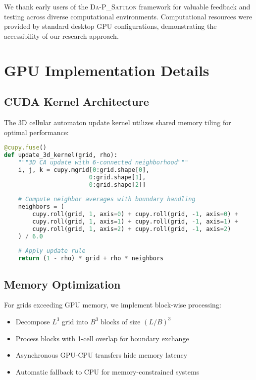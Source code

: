 \documentclass[twocolumn,showpacs,preprintnumbers,amsmath,amssymb,prb]{revtex4-2}
\newcommand{\satulon}{\textsc{Da-P\_Satulon}}
\begin{document}
We thank early users of the \satulon{} framework for valuable feedback and testing across diverse computational environments. Computational resources were provided by standard desktop GPU configurations, demonstrating the accessibility of our research approach.




\appendix

\section{GPU Implementation Details}
\label{app:gpu}

\subsection{CUDA Kernel Architecture}

The 3D cellular automaton update kernel utilizes shared memory tiling for optimal performance:

\begin{lstlisting}[language=Python, caption=GPU-accelerated 3D CA update kernel]
@cupy.fuse()
def update_3d_kernel(grid, rho):
    """3D CA update with 6-connected neighborhood"""
    i, j, k = cupy.mgrid[0:grid.shape[0], 
                        0:grid.shape[1], 
                        0:grid.shape[2]]
    
    # Compute neighbor averages with boundary handling
    neighbors = (
        cupy.roll(grid, 1, axis=0) + cupy.roll(grid, -1, axis=0) +
        cupy.roll(grid, 1, axis=1) + cupy.roll(grid, -1, axis=1) +
        cupy.roll(grid, 1, axis=2) + cupy.roll(grid, -1, axis=2)
    ) / 6.0
    
    # Apply update rule
    return (1 - rho) * grid + rho * neighbors
\end{lstlisting}

\subsection{Memory Optimization}

For grids exceeding GPU memory, we implement block-wise processing:
\begin{itemize}
\item Decompose $L^3$ grid into $B^3$ blocks of size $(L/B)^3$
\item Process blocks with 1-cell overlap for boundary exchange
\item Asynchronous GPU-CPU transfers hide memory latency
\item Automatic fallback to CPU for memory-constrained systems
\end{itemize}
\end{document}

